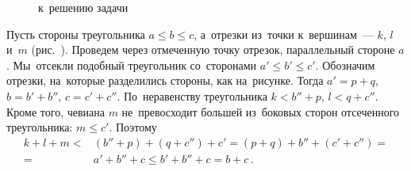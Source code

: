 \ifincludesolutions
\begin{figure}[ht]\begin{center}
    \caption{к~решению задачи~}%
\end{center}\end{figure}
Пусть стороны треугольника $a \leq b \leq c$, а~отрезки из~точки к~вершинам~---
$k$, $l$ и~$m$ (рис.~).
Проведем через отмеченную точку отрезок, параллельный стороне $a$.
Мы~отсекли подобный треугольник со~сторонами $a' \leq b' \leq c'$.
Обозначим отрезки, на~которые разделились стороны, как на~рисунке.
Тогда $a' = p + q$, $b = b' + b''$, $c = c' + c''$.
По~неравенству треугольника $k < b'' + p$, $l < q + c''$.
Кроме того, чевиана $m$ не~превосходит большей из~боковых сторон отсеченного
треугольника: $m \leq c'$.
Поэтому
\begin{align*}
    k + l + m
<{}&
    (b'' + p) + (q + c'') + c'
=
    (p + q) + b'' + (c' + c'')
=\\={}&
    a' + b'' + c
\leq
    b' + b'' + c
=
    b + c
\, . \end{align*}
\fi %

\endgroup %

